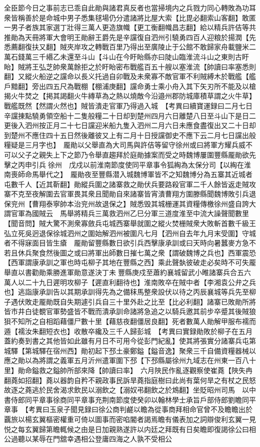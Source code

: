 全臣節今日之事前志已乖自此勛與諸君真反者也當掃境内之兵戮力同心轉敗為功耳衆皆稱善於是命城中男子悉集毬場仍分遣諸將比屋大索【比毘必翻索山客翻】敢匿一男子者族其家選丁壯得三萬人更造旗幟【更工衡翻幟昌志翻】給以精兵許佶等共推勛為天冊將軍大會明王勛辭王爵先是辛讜復自泗州引驍勇四百人迎粮於揚潤【先悉薦翻復扶又翻】賊夾岸攻之轉戰百里乃得出至廣陵止于公館不敢歸家舟載鹽米二萬石錢萬三千緡乙未還至斗山【斗山在今盱眙縣亦曰陡山臨淮流斗山之東則古盱眙】賊將王弘芝帥衆萬餘拒之於盱眙密布戰艦百五十艘以塞淮流【帥讀曰率塞悉則翻】又縱火船逆之讜命以長义托過自卯戰及未衆寡不敵官軍不利賊縛木於戰艦【艦戶黯翻】旁出四五尺為戰棚【棚浦庚翻】讜命勇士乘小舟入其下矢刃所不能及以槍揭火牛焚之【掲其謁翻火牛縳草為之熱以燒敵今沿邉州郡防城庫積草謂之火牛草】戰艦既然【然謂火然也】賊皆潰走官軍乃得過入城　【考異曰續寶運録曰二月七日辛讜㨂點驍勇領空船十二隻般糧二十日却到楚州四月六日離楚八日至斗山下是日二更後入泗州按正月二十七日讜迎米船九隻入泗州二月六日未應食盡復出又二十日却到楚州不應住四十五日然後離彼又上有二月十日授讜御史不應下云二月七日讜出般糧疑是三月字也】　龎勛以父舉直為大司馬與許佶等留守徐州或曰將軍方耀兵威不可以父子之親失上下之節乃令舉直趨拜於庭勛據案而受之時魏博屢圍豐縣龎勛欲先擊之丙申引兵徐州　戊戍以前淮南節度使同平章事令狐綯為太保分司【以綯在淮南喪師命馬舉代之】　龎勛夜至豐縣潜入城魏博軍皆不之知魏博分為五寨其近城者屯數千人【近其靳翻】勛縱兵圍之諸寨救之勛伏兵要路殺官軍二千人餘皆返走賊攻寨不克至夜解圍去官軍畏其衆且聞勛自來諸寨皆宵潰曹翔方圍滕縣聞魏博敗引兵退保兖州【曹翔泰寧帥本治兖州故退保之】賊悉毁其城栅運其資糧傳檄徐州盛自誇大謂官軍為國賊云　馬舉將精兵三萬救泗州乙巳分軍三道度淮至中流大譟聲聞數里【聞音問】賊大驚不測衆寡斂兵屯城西寨舉就圍之縱火焚栅賊衆大敗斬首數千級王弘立死吳迥退保徐城泗州之圍始解泗州被圍凡七月【泗州自去年九月末受圍】守城者不得寐面目皆生瘡　龎勛留豐縣數日欲引兵西擊康承訓或曰天時向暑蠶麥方急不若且休兵聚食然後圖之或曰將軍出師數日摧七萬之衆【謂破魏博之兵也】西軍震恐【西軍謂康承訓之軍也時屯柳子其地在豐縣之西】乘此聲埶彼破走必矣時不可失龎舉直以書勸勛乘勝進軍勛意遂決丁未豐縣庚戍至蕭約襄城留武小睢諸寨兵合五六萬人以二十九日遲明攻柳子【遲直利翻待也】淮南敗卒在賊中者【李湘袁公弁之兵也】逃詣康承訓告以其期承訓得先為之備秣馬整衆設伏以待之丙辰襄城等兵先至柳子遇伏敗走龎勛既自失期遽引兵自三十里外赴之比至【比必利翻】諸寨已敗勛所將皆市井白徒覩官軍勢盛皆不戰而潰承訓命諸將急追之以騎兵邀其前步卒蹙其後賊狼狽不知所之自相蹈藉僵尸數十里【藉慈夜翻僵居良翻】死者數萬人勛解甲服布襦而遁【襦汝朱翻短衣也】收散卒纔及三千人歸彭城　【考異曰實録勛敗於柳子在五月蓋約奏到書之其他皆如此雖有月日不可用今從彭門紀亂】使其將張實分諸寨兵屯第城驛【第城驛在宿州西】勛初起下邳土豪鄭鎰【鎰音逸】聚衆三千自備資糧器械以應之勛以為將謂之義軍五月沂州遣軍圍下邳【下邳縣屬徐州九域志在州東一百八十里】勛命鎰救之鎰帥所部來降【帥讀曰率】　六月陜民作亂逐觀察使崔蕘【陜失冉翻蕘如招翻】蕘以器韵自矜不親政事民訴旱蕘指庭樹曰此尚有葉何旱之有杖之民怒故逐之蕘逃於民舍渴求飲民以溺飲之【溺奴弔翻飲之於鴆翻】坐貶昭州司馬　以中書侍郎同平章事徐商同平章事充荆南節度使癸卯以翰林學士承旨戶部侍郎劉瞻同平章事　【考異曰玉泉子聞見録曰徐公商判鹺以瞻為從事商拜相命官曾不及瞻瞻出於覊旅以楊玄翼樞密權重可倚以圖事而密啗閽者謁焉瞻有儀表加之詞辯俊利玄翼一見悦之每玄翼歸第瞻輒候之由是日加親熟遂許以内廷之拜既有日矣瞻即復謁徐公曰相公過聽以某辱在門舘幸遇相公登庸四海之人孰不受相公